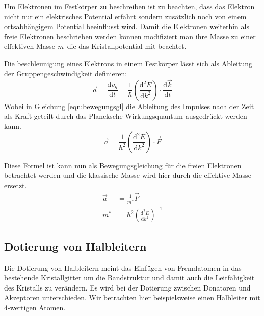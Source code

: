 Um Elektronen im Festkörper zu beschreiben ist zu beachten, dass das Elektron nicht nur ein elektrisches Potential erfährt sondern zusätzlich noch von einem ortsabhängigem Potential beeinflusst wird.
Damit die Elektronen weiterhin als freie Elektronen beschrieben werden können modifiziert man ihre Masse zu einer effektiven Masse $m^{\*}$ die das Kristallpotential mit beachtet.

Die beschleunigung eines Elektrons in einem Festkörper lässt sich als Ableitung der Gruppengeschwindigkeit definieren:
\begin{equation}
    \vec{a} = \frac{\text{d}v_g}{\text{d}t} = \frac{1}{\hbar} \left( \frac{\text{d}^2 E}{\text{d}k^2}\right) \cdot \frac{\text{d}\vec{k}}{\text{d}t}
    \label{eqn:bewegungsgl}
\end{equation}
Wobei in Gleichung \ref{eqn:bewegungsgl} die Ableitung des Impulses nach der Zeit als Kraft geteilt durch das Plancksche Wirkungsquantum ausgedrückt werden kann.
\begin{equation}
    \vec{a} = \frac{1}{\hbar^2} \left( \frac{\text{d}^2 E}{\text{d}k^2}\right) \cdot \vec{F}
\end{equation}

Diese Formel ist kann nun als Bewegungsgleichung für die freien Elektronen betrachtet werden und die klassische Masse wird hier durch die effektive Masse ersetzt.
\begin{align}
    \vec{a} &= \frac{1}{m^{*}} \vec{F}\\
    m^{*} &= \hbar^2 \left( \frac{\text{d}^2 E}{\text{d}k^2}\right)^{-1}
\end{align}

\subsection{Dotierung von Halbleitern}
Die Dotierung von Halbleitern meint das Einfügen von Fremdatomen in das bestehende Kristallgitter um die Bandstruktur und damit auch die Leitfähigkeit des Kristalls zu verändern.
Es wird bei der Dotierung zwischen Donatoren und Akzeptoren unterschieden.
Wir betrachten hier beispielsweise einen Halbleiter mit 4-wertigen Atomen.

